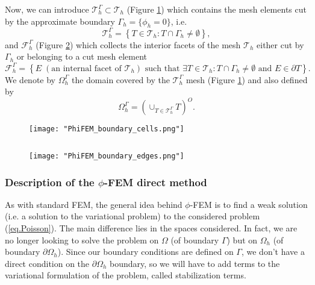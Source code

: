 Now, we can introduce $\mathcal{T}_h^\Gamma\subset \mathcal{T}_h$ (Figure \ref{space4}) which contains the mesh elements cut by the
approximate boundary $\Gamma_h = \{\phi_h=0\}$, i.e. 
\begin{equation*}
	\mathcal{T}_h^\Gamma=\left\{T\in \mathcal{T}_h:T\cap\Gamma_h\ne\emptyset\right\},
\end{equation*}
and $\mathcal{F}_h^\Gamma$ (Figure \ref{space5}) which collects the interior facets of the mesh $\mathcal{T}_h$ either cut by $\Gamma_h$ or belonging to a cut mesh element
\begin{equation*}
	\mathcal{F}_h^\Gamma=\left\{E\;(\text{an internal facet of } \mathcal{T}_h) \text{ such that } \exists T\in \mathcal{T}_h:T\cap\Gamma_h\ne\emptyset \text{ and } E\in\partial T\right\}.
\end{equation*}
We denote by $\Omega_h^\Gamma$ the domain covered by the $\mathcal{T}_h^\Gamma$ mesh (Figure \ref{space4}) and also defined by
\begin{equation*}
	\Omega_h^\Gamma=\left(\cup_{T\in\mathcal{T}_h^\Gamma}T\right)^O.
\end{equation*}

\begin{minipage}{0.48\linewidth}
	\begin{figure}[H]
		\centering
		\texttt{[image: "PhiFEM\_boundary\_cells.png"]}
		\label{space4}
	\end{figure}
\end{minipage} $\qquad$
\begin{minipage}{0.48\linewidth}
	\begin{figure}[H]
		\centering
		\texttt{[image: "PhiFEM\_boundary\_edges.png"]}
		\label{space5}
	\end{figure}
\end{minipage}

\subsubsection{Description of the $\phi$-FEM direct method} \label{FEMs.PhiFEM.direct_method}

As with standard FEM, the general idea behind $\phi$-FEM is to find a weak solution (i.e. a solution to the variational problem) to the considered problem (\ref{eq.Poisson}). The main difference lies in the spaces considered. In fact, we are no longer looking to solve the problem on $\Omega$ (of boundary $\Gamma$) but on $\Omega_h$ (of boundary $\partial\Omega_h$). Since our boundary conditions are defined on $\Gamma$, we don't have a direct condition on the $\partial\Omega_h$ boundary, so we will have to add terms to the variational formulation of the problem, called stabilization terms.


